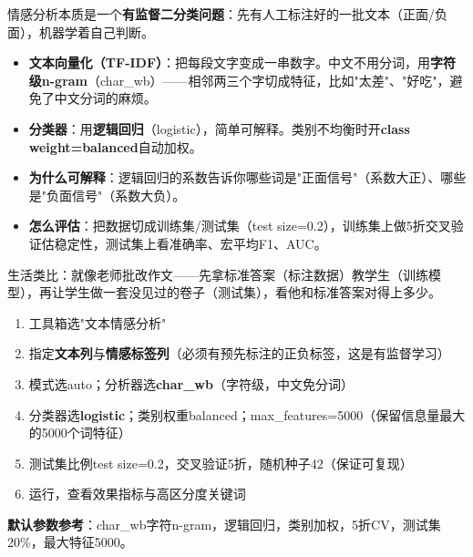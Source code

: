 \begin{algoprinciple}
情感分析本质是一个\textbf{有监督二分类问题}：先有人工标注好的一批文本（正面/负面），机器学着自己判断。

\begin{itemize}
    \item \textbf{文本向量化（TF-IDF）}：把每段文字变成一串数字。中文不用分词，用\textbf{字符级n-gram}（char\_wb）——相邻两三个字切成特征，比如"太差"、"好吃"，避免了中文分词的麻烦。
    \item \textbf{分类器}：用\textbf{逻辑回归}（logistic），简单可解释。类别不均衡时开\textbf{class weight=balanced}自动加权。
    \item \textbf{为什么可解释}：逻辑回归的系数告诉你哪些词是"正面信号"（系数大正）、哪些是"负面信号"（系数大负）。
    \item \textbf{怎么评估}：把数据切成训练集/测试集（test size=0.2），训练集上做5折交叉验证估稳定性，测试集上看准确率、宏平均F1、AUC。
\end{itemize}

生活类比：就像老师批改作文——先拿标准答案（标注数据）教学生（训练模型），再让学生做一套没见过的卷子（测试集），看他和标准答案对得上多少。
\end{algoprinciple}

\begin{algosposs}
\begin{enumerate}
    \item 工具箱选"文本情感分析"
    \item 指定\textbf{文本列}与\textbf{情感标签列}（必须有预先标注的正负标签，这是有监督学习）
    \item 模式选auto；分析器选\textbf{char\_wb}（字符级，中文免分词）
    \item 分类器选\textbf{logistic}；类别权重balanced；max\_features=5000（保留信息量最大的5000个词特征）
    \item 测试集比例test size=0.2，交叉验证5折，随机种子42（保证可复现）
    \item 运行，查看效果指标与高区分度关键词
\end{enumerate}

\textbf{默认参数参考}：char\_wb字符n-gram，逻辑回归，类别加权，5折CV，测试集20\%，最大特征5000。
\end{algosposs}

